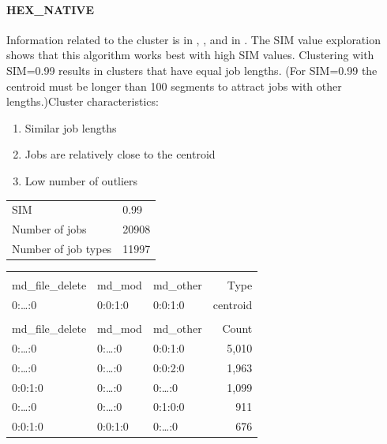\documentclass[]{llncs}
\begin{document}
\paragraph{HEX\_NATIVE}
Information related to the cluster is in , , and in .
The SIM value exploration shows that this algorithm works best with high SIM values.
Clustering with SIM=0.99 results in clusters that have equal job lengths.
(For SIM=0.99 the centroid must be longer than 100 segments to attract jobs with other lengths.)Cluster characteristics:
\begin{enumerate}
 \item Similar job lengths
 \item Jobs are relatively close to the centroid
 \item Low number of outliers
\end{enumerate}

\begingroup
  \centering
  \begin{tabular}{ll}
    SIM & 0.99 \\
    Number of jobs & 20908 \\
    Number of job types & 11997 \\
  \end{tabular}
  \label{tab:hex_native:stats}
\endgroup

\begingroup
  \centering
  \begin{tiny}
    \begin{tabular}{@{ }l@{ }@{ }l@{ }@{ }l@{ }|@{ }r@{ }}
      \rowcolor{tabhcolor}
      \multicolumn{3}{@{ }l|@{ }}{Hexadecimal coding} &            \\
      \rowcolor{tabhcolor}
      md\_file\_delete     &  md\_mod   & md\_other & Type     \\
      \hline
      0:\dots:0            &  0:0:1:0   & 0:0:1:0   & centroid \\
      \multicolumn{4}{l}{} \\
      \rowcolor{tabhcolor}
      md\_file\_delete     &  md\_mod   & md\_other & Count    \\
      \hline
      0:\dots:0            &  0:\dots:0 & 0:0:1:0   & 5,010    \\
      0:\dots:0            &  0:\dots:0 & 0:0:2:0   & 1,963    \\
      0:0:1:0              &  0:\dots:0 & 0:\dots:0 & 1,099    \\
      0:\dots:0            &  0:\dots:0 & 0:1:0:0   & 911      \\
      0:0:1:0              &  0:0:1:0   & 0:\dots:0 & 676      \\
    \end{tabular}
  \end{tiny}
  \label{tab:hex_native:top_jobs}\endgroup
\end{document}
